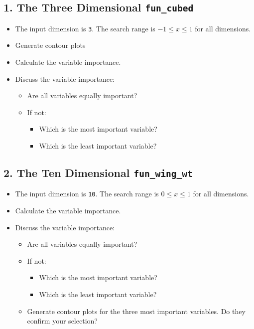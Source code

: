 \documentclass[
  letterpaper,
  DIV=11,
  numbers=noendperiod]{scrreprt}
\providecommand{\tightlist}{%
  \setlength{\itemsep}{0pt}\setlength{\parskip}{0pt}}\usepackage{longtable,booktabs,array}
\begin{document}
\subsection{\texorpdfstring{1. The Three Dimensional
\texttt{fun\_cubed}}{1. The Three Dimensional fun\_cubed}}\label{the-three-dimensional-fun_cubed}

\begin{itemize}
\tightlist
\item
  The input dimension is \texttt{3}. The search range is
  \(-1 \leq x \leq 1\) for all dimensions.
\item
  Generate contour plots
\item
  Calculate the variable importance.
\item
  Discuss the variable importance:

  \begin{itemize}
  \tightlist
  \item
    Are all variables equally important?
  \item
    If not:

    \begin{itemize}
    \tightlist
    \item
      Which is the most important variable?
    \item
      Which is the least important variable?
    \end{itemize}
  \end{itemize}
\end{itemize}

\subsection{\texorpdfstring{2. The Ten Dimensional
\texttt{fun\_wing\_wt}}{2. The Ten Dimensional fun\_wing\_wt}}\label{the-ten-dimensional-fun_wing_wt}

\begin{itemize}
\tightlist
\item
  The input dimension is \texttt{10}. The search range is
  \(0 \leq x \leq 1\) for all dimensions.
\item
  Calculate the variable importance.
\item
  Discuss the variable importance:

  \begin{itemize}
  \tightlist
  \item
    Are all variables equally important?
  \item
    If not:

    \begin{itemize}
    \tightlist
    \item
      Which is the most important variable?
    \item
      Which is the least important variable?
    \end{itemize}
  \item
    Generate contour plots for the three most important variables. Do
    they confirm your selection?
  \end{itemize}
\end{itemize}
\end{document}
